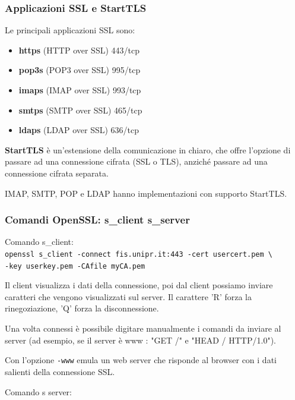         \subsubsection{Applicazioni SSL e StartTLS}
            Le principali applicazioni SSL sono:
            \begin{itemize}
                \item \textbf{https} (HTTP over SSL) 443/tcp
                \item \textbf{pop3s} (POP3 over SSL) 995/tcp
                \item \textbf{imaps} (IMAP over SSL) 993/tcp
                \item \textbf{smtps} (SMTP over SSL) 465/tcp
                \item \textbf{ldaps} (LDAP over SSL) 636/tcp
            \end{itemize}

            \textbf{StartTLS} è un'estensione della comunicazione in chiaro, che offre l'opzione di passare ad una connessione cifrata (SSL o TLS), anziché passare ad una connessione cifrata separata.

            IMAP, SMTP, POP e LDAP hanno implementazioni con supporto StartTLS.

        \subsubsection{Comandi OpenSSL: s\_client s\_server}
            Comando s\_client:\\
            \verb|openssl s_client -connect fis.unipr.it:443 -cert usercert.pem \|\\
            \verb|-key userkey.pem -CAfile myCA.pem|

            Il client visualizza i dati della connessione, poi dal client possiamo inviare caratteri che vengono visualizzati sul server. Il carattere 'R' forza la rinegoziazione, 'Q' forza la disconnessione.

            Una volta connessi è possibile digitare manualmente i comandi da inviare al server (ad esempio, se il server è www : "GET /" e "HEAD / HTTP/1.0").

            

            Con l'opzione \verb|-www| emula un web server che risponde al browser con i dati salienti della connessione SSL.
            
            Comando s server:

